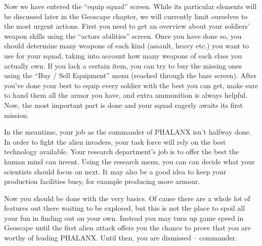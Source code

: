 Now we have entered the ``equip squad'' screen. While its particular elements will be discussed later in the Geoscape chapter, we will currently limit ourselves to the most urgent actions. First you need to get an overview about your soldiers' weapon skills using the ``actors abilities'' screen. Once you have done so, you should determine many weapons of each kind (assault, heavy etc.) you want to use for your squad, taking into account how many weapons of each class you actually own. If you lack a certain item, you can try to buy the missing ones using the ``Buy / Sell Equipment'' menu (reached through the base screen). After you've done your best to equip every soldier with the best you can get, make sure to hand them all the armor you have, and extra ammunition is always helpful. Now, the most important part is done and your squad eagerly awaits its first mission.

In the meantime, your job as the commander of PHALANX isn't halfway done. In order to fight the alien invaders, your task force will rely on the best technology available. Your research department's job is to offer the best the human mind can invent. Using the research menu, you can can decide what your scientists should focus on next. It may also be a good idea to keep your production facilities busy, for example producing more armour.

Now you should be done with the very basics. Of cause there are a whole lot of features out there waiting to be explored, but this is not the place to spoil all your fun in finding out on your own. Instead you may turn up game speed in Geoscape until the first alien attack offers you the chance to prove that you are worthy of leading PHALANX. Until then, you are dismissed -- commander.


